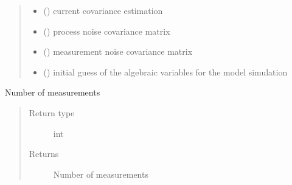 \documentclass[letterpaper,10pt,english]{sphinxmanual}
\begin{document}
\begin{fulllineitems}
\begin{fulllineitems}
\begin{quote}
\begin{description}
\begin{itemize}
\item {} 
 () \textendash{} current covariance estimation

\item {} 
 () \textendash{} process noise covariance matrix

\item {} 
 () \textendash{} measurement noise covariance matrix

\item {} 
 () \textendash{} initial guess of the algebraic variables for the model simulation

\end{itemize}

\end{description}\end{quote}

\end{fulllineitems}


\begin{fulllineitems}
\label{\detokenize{yaocptool.estimation:yaocptool.estimation.extended_kalman_filter.ExtendedKalmanFilter.estimate}}
\end{fulllineitems}


\begin{fulllineitems}
\label{\detokenize{yaocptool.estimation:yaocptool.estimation.extended_kalman_filter.ExtendedKalmanFilter.n_meas}}
Number of measurements
\begin{quote}\begin{description}
\item[{Return type}] \leavevmode
int

\item[{Returns}] \leavevmode
Number of measurements

\end{description}\end{quote}

\end{fulllineitems}


\end{fulllineitems}
\end{document}
